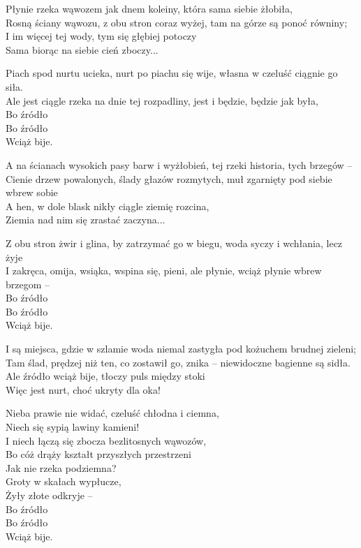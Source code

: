 \begin{text}
    Płynie rzeka wąwozem jak dnem koleiny, która sama siebie żłobiła,\\
    Rosną ściany wąwozu, z obu stron coraz wyżej, tam na górze są ponoć równiny;\\
    I im więcej tej wody, tym się głębiej potoczy\\
    Sama biorąc na siebie cień zboczy...

    Piach spod nurtu ucieka, nurt po piachu się wije, własna w czeluść ciągnie go siła.\\
    Ale jest ciągle rzeka na dnie tej rozpadliny, jest i będzie, będzie jak była,\\
    Bo źródło\\
    Bo źródło\\
    Wciąż bije.

    A na ścianach wysokich pasy barw i wyżłobień, tej rzeki historia, tych brzegów –\\
    Cienie drzew powalonych, ślady głazów rozmytych, muł zgarnięty pod siebie wbrew sobie\\
    A hen, w dole blask nikły ciągle ziemię rozcina,\\
    Ziemia nad nim się zrastać zaczyna...

    Z obu stron żwir i glina, by zatrzymać go w biegu, woda syczy i wchłania, lecz żyje\\
    I zakręca, omija, wsiąka, wspina się, pieni, ale płynie, wciąż płynie wbrew brzegom –\\
    Bo źródło\\
    Bo źródło\\
    Wciąż bije.

    I są miejsca, gdzie w szlamie woda niemal zastygła pod kożuchem brudnej zieleni;\\
    Tam ślad, prędzej niż ten, co zostawił go, znika – niewidoczne bagienne są sidła.\\
    Ale źródło wciąż bije, tłoczy puls między stoki\\
    Więc jest nurt, choć ukryty dla oka!

    Nieba prawie nie widać, czeluść chłodna i ciemna,\\
    Niech się sypią lawiny kamieni!\\
    I niech łączą się zbocza bezlitosnych wąwozów,\\
    Bo cóż drąży kształt przyszłych przestrzeni\\
    Jak nie rzeka podziemna?\\
    Groty w skałach wypłucze,\\
    Żyły złote odkryje –\\
    Bo źródło\\
    Bo źródło\\
    Wciąż bije.
\end{text}
